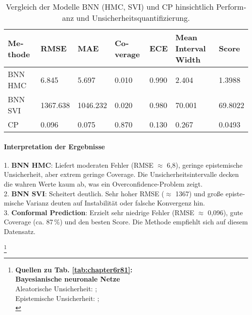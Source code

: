 \begin{otherlanguage}{ngerman}
\begin{table}[!htbp]
  \centering
  \footnotesize
  \begin{tabularx}{\textwidth}{|X|X|X|X|X|X|X|}
  \hline
  \textbf{Methode} & \textbf{RMSE} & \textbf{MAE} & \textbf{Coverage} & \textbf{ECE} & \textbf{Mean Interval Width} & \textbf{Score} \\
  \hline
  BNN HMC & 6.845 & 5.697 & 0.010 & 0.990 & 2.404 & 1.3988 \\
  \hline
  BNN SVI & 1367.638 & 1046.232 & 0.020 & 0.980 & 70.001 & 69.8022 \\
  \hline
  CP      & 0.096 & 0.075 & 0.870 & 0.130 & 0.267 & 0.0493 \\
  \hline
  \end{tabularx}
  \caption{Vergleich der Modelle BNN (HMC, SVI) und CP hinsichtlich Performanz und Unsicherheitsquantifizierung.}
  \label{tab:r8_results}
\end{table}


\paragraph{Interpretation der Ergebnisse}

1. \textbf{BNN HMC}: Liefert moderaten Fehler (RMSE $\approx$ 6{,}8), geringe epistemische Unsicherheit, aber extrem geringe Coverage. Die Unsicherheitsintervalle decken die wahren Werte kaum ab, was ein Overconfidence-Problem zeigt.\\
2. \textbf{BNN SVI}: Scheitert deutlich. Sehr hoher RMSE ($\approx$ 1367) und große epistemische Varianz deuten auf Instabilität oder falsche Konvergenz hin.\\
3. \textbf{\gls{Conformal Prediction}}: Erzielt sehr niedrige Fehler (RMSE $\approx$ 0{,}096), gute Coverage (ca. 87\,\%) und den besten Score. Die Methode empfiehlt sich auf diesem Datensatz.



\footnote{%
\begin{minipage}[t]{\textwidth}
\scriptsize
\textbf{Quellen zu Tab. \ref{tab:chapter6r81}:}\\[0.5em]
\textbf{\gls{Bayesianische neuronale Netze}}\\
Aleatorische Unsicherheit: \parencite[Kap.~3]{blundell2015weight}; \parencite[S.~40–42]{gal2016uncertainty} \\
Epistemische Unsicherheit: \parencite[S.~40–42]{gal2016uncertainty}; \parencite{mackay1992practical} \\[0.5em]


\end{minipage}}
\end{otherlanguage}
